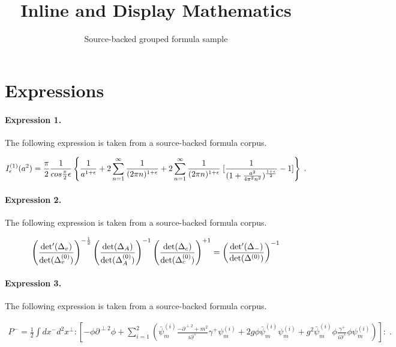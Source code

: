 \documentclass[11pt]{article}
\title{Inline and Display Mathematics}
\author{Source-backed grouped formula sample}
\date{}
\begin{document}
\maketitle
\section{Expressions}
\paragraph{Expression 1.} The following expression is taken from a source-backed formula corpus.

\begin{align*}I^{(1)}_{\epsilon}(a^2)={{\pi}\over 2} {1\over {cos {{\pi}\over 2}\epsilon}}\left \{ {1\over {a^{1+ \epsilon}}}+ 2 \sum_{n=1}^{\infty} {1\over {(2 \pi n)^{1+\epsilon}}}+ 2\sum_{n=1}^{\infty} {1\over {(2 \pi n)^{1+\epsilon}}} \; [ {1\over {(1+ {{a^2}\over {4 \pi^2 n^2}})^{{1+\epsilon}\over 2}}} -1 ] \right \} \; .\end{align*}

\paragraph{Expression 2.} The following expression is taken from a source-backed formula corpus.

\begin{align*}\left(\frac{{\rm det'}(\Delta_{v})}{{\rm det}(\Delta^{(0)}_{v})}\right)^{-\frac{1}{2}}\left(\frac{{\rm det}(\Delta_{A})}{{\rm det}(\Delta^{(0)}_{A})}\right)^{-1}\left(\frac{{\rm det}(\Delta_{c})}{{\rm det}(\Delta^{(0)}_{c})}\right)^{+1} = \left(\frac{{\rm det'}(\Delta_{-})}{{\rm det}(\Delta^{(0)})}\right)^{-1}\end{align*}

\paragraph{Expression 3.} The following expression is taken from a source-backed formula corpus.

\begin{align*}P^-=\frac{1}{2}\int dx^-d^2x^\perp : \left[ -\phi\partial^{\perp2}\phi +\sum_{i=1}^2\left( \bar\psi_{m}^{(i)}\frac{-\partial^{\perp2}+m^2}{i\partial^+}\gamma^+\psi_{m}^{(i)}+ 2g\phi \bar \psi_{m}^{(i)} \psi_{m}^{(i)} +g^2 \bar\psi_{m}^{(i)}\phi \frac{\gamma^+}{i\partial^+}\phi \psi_{m}^{(i)}\right)\right]:\;.\end{align*}
\end{document}
